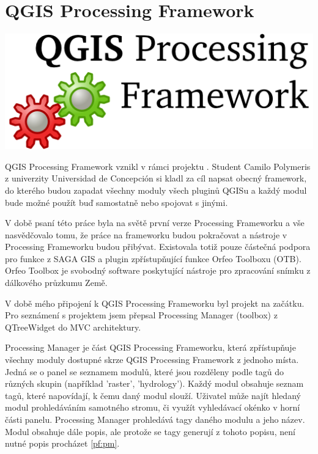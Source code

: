\newpage
{}
\section{QGIS Processing Framework}
\nocite{pf:www}


\begin{center}
		\includegraphics[scale=0.30]{pictures/qgis_pf}
\end{center}

QGIS Processing Framework vznikl v rámci projektu  . Student Camilo Polymeris z univerzity Universidad de Concepción si kladl za cíl napsat obecný framework, do kterého budou zapadat všechny moduly všech pluginů QGISu a každý modul bude možné použít buď samostatně nebo spojovat s jinými.

V době psaní této práce byla na světě první verze Processing Frameworku a vše nasvědčovalo tomu, že práce na frameworku budou pokračovat a nástroje v Processing Frameworku budou přibývat. Existovala totiž pouze částečná  podpora pro funkce z SAGA GIS a plugin zpřístupňující funkce  Orfeo Toolboxu (OTB). Orfeo Toolbox je svobodný software poskytující nástroje pro zpracování snímku z  dálkového průzkumu Země.

V době mého připojení k QGIS Processing Frameworku byl projekt na začátku. Pro seznámení s projektem jsem přepsal Processing Manager (toolbox) z QTreeWidget do MVC architektury.

Processing Manager je část QGIS Processing Frameworku, která zpřístupňuje všechny moduly dostupné skrze QGIS Processing Framework z jednoho místa. Jedná se o panel se seznamem modulů, které jsou rozděleny podle tagů do různých skupin (například 'raster', 'hydrology'). Každý modul obsahuje seznam tagů, které napovídají, k čemu daný modul slouží. Uživatel může najít hledaný modul prohledáváním samotného stromu, či využít vyhledávací okénko v horní části panelu. Processing Manager prohledává tagy daného modulu a jeho název. Modul obsahuje dále popis, ale protože se tagy generují z tohoto popisu, není nutné popis procházet \figurename \ref{pf:pm}.

